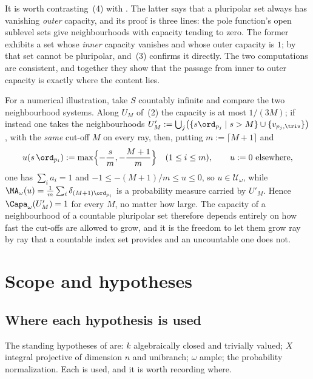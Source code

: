 \begin{example}
\label{ex:ch48-pluripolar-cap-zero}
It is worth contrasting \,(4) with
.  The latter says that a pluripolar
set always has vanishing \emph{outer} capacity, and its proof is three
lines: the pole function's open sublevel sets give neighbourhoods
with capacity tending to zero.  The former exhibits a set whose \emph{inner} capacity
vanishes and whose outer capacity is $1$; by
 that set cannot be pluripolar, and
\,(3) confirms it directly.  The two
computations are consistent, and together they show that the passage from
inner to outer capacity is exactly where the content lies.

For a numerical illustration, take $S$ countably infinite and compare the two
neighbourhood systems.  Along $U_M$ of
\,(2) the capacity is at most
$1/(3M)$; if instead one takes the neighbourhoods
$U'_M:=\bigcup_j\bigl(\{s\ord_{p_j}\mid s>M\}
\cup\{v_{p_j,\triv}\}\bigr)$, with the
\emph{same} cut-off $M$ on every ray, then, putting
$m:=\lceil M+1\rceil$ and
\[
 u(s\,\ord_{p_i}):=\max\Bigl\{-\frac sm,-\frac{M+1}m\Bigr\}
 \quad(1\le i\le m),\qquad u:=0\ \text{elsewhere},
\]
one has $\sum_ia_i=1$ and $-1\le-(M+1)/m\le u\le0$, so
$u\in\mathcal U_\omega$, while
$\MA_\omega(u)=\frac1m\sum_i\delta_{(M+1)\ord_{p_i}}$ is a probability
measure carried by $U'_M$.  Hence $\Capa_\omega(U'_M)=1$ for every
$M$, no matter how large.  The capacity of a neighbourhood
of a countable pluripolar set therefore depends entirely on how fast the
cut-offs are allowed to grow, and it is the freedom to let them grow ray by
ray that a countable index set provides and an uncountable one does not.
\end{example}

\section{Scope and hypotheses}
\label{sec:ch48-scope}

\subsection{Where each hypothesis is used}
\label{sec:ch48-hypothesis-use}

The standing hypotheses of  are: $k$
algebraically closed and trivially valued; $X$ integral projective of
dimension $n$ and unibranch; $\omega$ ample; the probability
normalization.  Each is used, and it is worth recording where.


